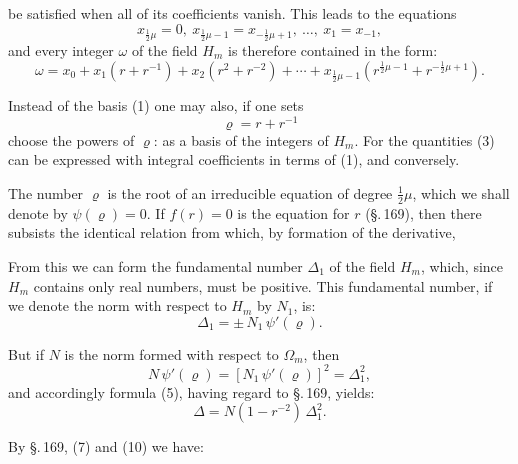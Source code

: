be satisfied when all of its coefficients vanish. This leads to the equations
\[
x_{\frac12\mu}=0,\ x_{\frac12\mu-1}=x_{-\frac12\mu+1},\ \dots,\ x_1=x_{-1},
\]
and every integer $\omega$ of the field $H_m$ is therefore contained in the form:
\[
\omega = x_0+x_1(r+r^{-1})+x_2(r^2+r^{-2})+\cdots
+x_{\frac12\mu-1}(r^{\frac12\mu-1}+r^{-\frac12\mu+1}).
\]

Instead of the basis (1) one may also, if one sets
\[
\varrho = r+r^{-1}
\]
choose the powers of $\varrho$:
as a basis of the integers of $H_m$. For the quantities (3) can be expressed with integral coefficients in terms of (1), and conversely.

The number $\varrho$ is the root of an irreducible equation of degree $\frac12\mu$, which we shall denote by $\psi(\varrho)=0$. If $f(r)=0$ is the equation for $r$ (\S.\,169), then there subsists the identical relation
from which, by formation of the derivative,

From this we can form the fundamental number $\Delta_1$ of the field $H_m$, which, since $H_m$ contains only real numbers, must be positive. This fundamental number, if we denote the norm with respect to $H_m$ by $N_1$, is:
\[
\Delta_1 = \pm\,N_1\,\psi'(\varrho).
\]

But if $N$ is the norm formed with respect to $\Omega_m$, then
\[
N\,\psi'(\varrho) = [N_1\,\psi'(\varrho)]^2 = \Delta_1^2,
\]
and accordingly formula (5), having regard to \S.\,169, yields:
\[
\Delta = N(1-r^{-2})\,\Delta_1^2.
\]

By \S.\,169, (7) and (10) we have:
